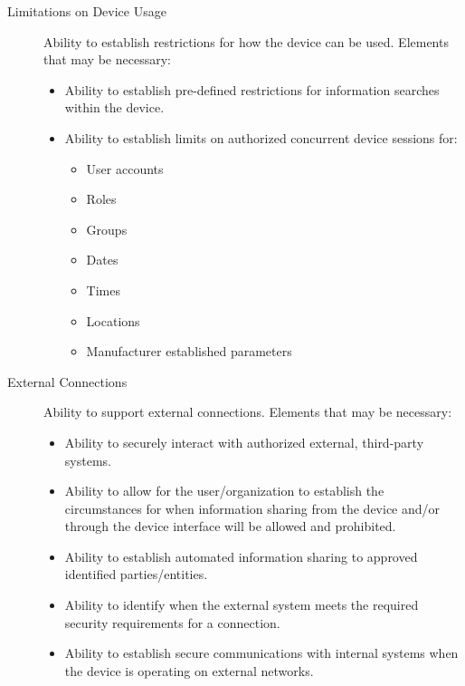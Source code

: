 \begin{description}
    
    \item[Limitations on Device Usage] Ability to establish restrictions for how the device can be used. Elements that may be necessary:
    \begin{itemize}
        \item Ability to establish pre-defined restrictions for information searches within the device.
        \item Ability to establish limits on authorized concurrent device sessions for:
        \begin{itemize}
            \item User accounts
            \item Roles
            \item Groups
            \item Dates
            \item Times
            \item Locations
            \item Manufacturer established parameters
        \end{itemize}
    \end{itemize}
    
    
    \item[External Connections] Ability to support external connections. Elements that may be necessary:
    \begin{itemize}
        \item Ability to securely interact with authorized external, third-party systems.
        \item Ability to allow for the user/organization to establish the circumstances for when information sharing from the device and/or through the device interface will be allowed and prohibited.
        \item Ability to establish automated information sharing to approved identified parties/entities.
        \item Ability to identify when the external system meets the required security requirements for a connection.
        \item Ability to establish secure communications with internal systems when the device is operating on external networks.
    \end{itemize}
    

\end{description}
